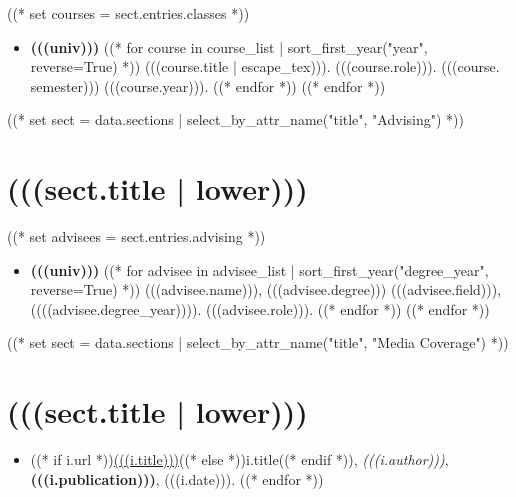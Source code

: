 \documentclass[10pt,oneside]{article}
\begin{document}
\mbox{}\vspace{-\dimexpr\baselineskip\relax}

((* set courses = sect.entries.classes *))
\begin{itemize}[label={}]
  ((* for univ, course_list in courses | groupby("university")  *))
  \item \textbf{(((univ)))}
        ((* for course in course_list | sort_first_year("year", reverse=True) *))
        (((course.title | escape_tex))). (((course.role))). (((course. semester))) (((course.year))).
        ((* endfor *))
        ((* endfor *))
\end{itemize}

((* set sect = data.sections | select_by_attr_name("title", "Advising") *))
\section{(((sect.title | lower)))}

\mbox{}\vspace{-\dimexpr\baselineskip\relax}

((* set advisees = sect.entries.advising *))
\begin{itemize}[label={}]
  ((* for univ, advisee_list in advisees | groupby("university")  *))
  \item \textbf{(((univ)))}
        ((* for advisee in advisee_list | sort_first_year("degree_year", reverse=True) *))
        (((advisee.name))), (((advisee.degree))) (((advisee.field))), ((((advisee.degree_year)))). (((advisee.role))).
        ((* endfor *))
        ((* endfor *))
\end{itemize}

((* set sect = data.sections | select_by_attr_name("title", "Media Coverage") *))
\section{(((sect.title | lower)))}

\mbox{}\vspace{-\dimexpr\baselineskip\relax}

\begin{itemize}[label={}]
  ((* for i in sect.entries.media | sort(attribute="date", reverse=True) *))
  \item ((* if i.url *))\href{(((i.url)))}{(((i.title)))}((* else *))i.title((* endif *)), \textit{(((i.author)))}, \textbf{(((i.publication)))}, (((i.date))).
        ((* endfor *))
\end{itemize}
\end{document}
